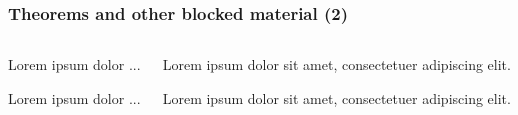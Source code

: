 \documentclass[aspectratio=1610]{beamer}
\begin{document}
\begin{frame}[fragile]
  \frametitle{Theorems and other blocked material (2)}
  \begin{columns}[onlytextwidth]
    \begin{column}{0.45\textwidth}
\begin{CodeBox}{}
\begin{lemma}[lemma]
  Lorem ipsum dolor ...
\end{lemma}
\end{CodeBox}

\begin{CodeBox}{}
\begin{corollary}[corollary]
  Lorem ipsum dolor ...
\end{corollary}
\end{CodeBox}
    \end{column}\textwidth%
    \begin{column}{0.5\textwidth}
      \begin{lemma}[lemma]
        Lorem ipsum dolor sit amet, consectetuer adipiscing elit.
      \end{lemma}
      \begin{corollary}[corollary]
        Lorem ipsum dolor sit amet, consectetuer adipiscing elit.
      \end{corollary}
    \end{column}
  \end{columns}
\end{frame}
\end{document}
